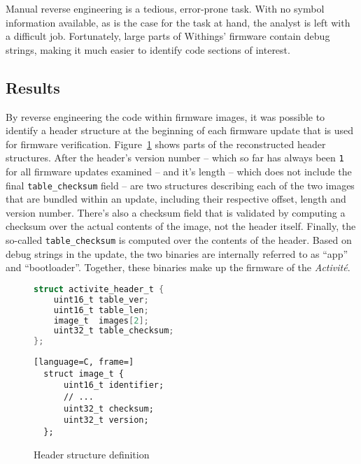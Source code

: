 \documentclass[english]{lni}
\begin{document}
Manual reverse engineering is a tedious, error-prone task. With no symbol information available, as is the case for the task at hand, the analyst is left with a difficult job. Fortunately, large parts of Withings' firmware contain debug strings, making it much easier to identify code sections of interest.

\subsection{Results}
\label{results}

By reverse engineering the code within firmware images, it was possible to identify a header structure at the beginning of each firmware update that is used for firmware verification.  Figure~\ref{fig:header_structure} shows parts of the reconstructed header structures. After the header's version number -- which so far has always been \texttt{1} for all firmware updates examined -- and it's length -- which does not include the final \texttt{table\_checksum} field -- are two structures describing each of the two images that are bundled within an update, including their respective offset, length and version number. There's also a checksum field that is validated by computing a checksum over the actual contents of the image, not the header itself. Finally, the so-called \texttt{table\_checksum} is computed over the contents of the header. Based on debug strings in the update, the two binaries are internally referred to as ``app'' and ``bootloader''. Together, these binaries make up the firmware of the \emph{Activité}.

\begin{figure}[htb]
\caption{Header structure definition}
\label{fig:header_structure}
\begin{minipage}{.5\textwidth}
	\begin{lstlisting}[language=C, frame=r]
struct activite_header_t {
    uint16_t table_ver;
    uint16_t table_len;
    image_t  images[2];
    uint32_t table_checksum;
};
	\end{lstlisting}
\end{minipage}
\begin{minipage}{.5\textwidth}
	\begin{lstlisting}[language=C, frame=]
  struct image_t {
      uint16_t identifier;
      // ...
      uint32_t checksum;
      uint32_t version;
  };
	\end{lstlisting}
\end{minipage}	
\end{figure}
\end{document}
